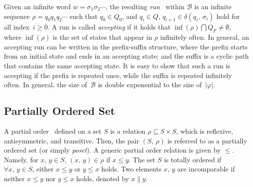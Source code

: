 Given an infinite word $w=\sigma_1\sigma_2\cdots$, the resulting \emph{run}~\citep{baier2008principles} within $\mathcal{B}$
is an infinite sequence $\rho=q_0q_1q_2\cdots$
such that $q_0\in Q_0$, and $q_i\in Q$, $q_{i+1}\in\delta(q_i,\,\sigma_i)$ hold for all index~$i\geq 0$.
A run is called \emph{accepting} if it holds that
$\inf(\rho)\bigcap {Q}_F \neq \emptyset$,
where $\inf(\rho)$ is the set of states that appear in $\rho$ infinitely often.
In general, an accepting run can be written in the prefix-suffix structure,
where the prefix starts from an initial state and ends in an accepting state;
and the suffix is a cyclic path that contains the same accepting state.
It is easy to show that such a run is accepting if the prefix is repeated once,
while the suffix is repeated infinitely often.
In general, the size of~$\mathcal{B}$ is double exponential to the size of~$|\varphi|$.

\subsection{Partially Ordered Set}\label{subsec:partial}
A partial order~\citep{simovici2008mathematical} defined on a set $S$ is a relation $\rho\subseteq S\times S$,
which is reflexive, antisymmetric, and transitive.
Then, the pair $(S,\, \rho)$ is referred to as a partially ordered set (or simply \emph{poset}).
A generic partial order relation is given by $\leq$.
Namely, for $x,\,y\in S$, $(x,\,y)\in \rho$ if $x\leq y$.
The set $S$ is totally ordered if $\forall x,\,y\in S$, either $x\leq y$ or $y\leq x$ holds.
Two elements $x,\,y$ are incomparable if neither $x\leq y$ nor $y\leq x$ holds, denoted by $x\parallel y$.

